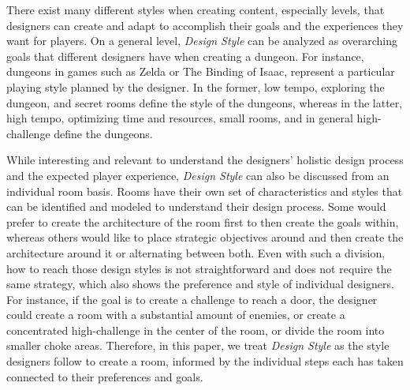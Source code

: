 There exist many different styles when creating content, especially levels, that designers can create and adapt to accomplish their goals and the experiences they want for players. On a general level, \emph{Design Style} can be analyzed as overarching goals that different designers have when creating a dungeon. For instance, dungeons in games such as Zelda or The Binding of Isaac, represent a particular playing style planned by the designer. In the former, low tempo, exploring the dungeon, and secret rooms define the style of the dungeons, whereas in the latter, high tempo, optimizing time and resources, small rooms, and in general high-challenge define the dungeons. 

While interesting and relevant to understand the designers' holistic design process and the expected player experience, \emph{Design Style} can also be discussed from an individual room basis. Rooms have their own set of characteristics and styles that can be identified and modeled to understand their design process. Some would prefer to create the architecture of the room first to then create the goals within, whereas others would like to place strategic objectives around and then create the architecture around it or alternating between both. Even with such a division, how to reach those design styles is not straightforward and does not require the same strategy, which also shows the preference and style of individual designers. For instance, if the goal is to create a challenge to reach a door, the designer could create a room with a substantial amount of enemies, or create a concentrated high-challenge in the center of the room, or divide the room into smaller choke areas. Therefore, in this paper, we treat \emph{Design Style} as the style designers follow to create a room, informed by the individual steps each has taken connected to their preferences and goals.




